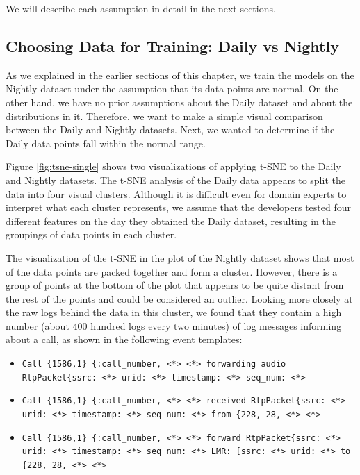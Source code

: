 We will describe each assumption in detail in the next sections.

\subsection{Choosing Data for Training: Daily vs Nightly}
\label{assumption-daily-vs-nightly}

As we explained in the earlier sections of this chapter, we train the models on the Nightly dataset under the assumption that its data points are normal. On the other hand, we have no prior assumptions about the Daily dataset and about the distributions in it. Therefore, we want to make a simple visual comparison between the Daily and Nightly datasets. Next, we wanted to determine if the Daily data points fall within the normal range.

Figure \ref{fig:tsne-single} shows two visualizations of applying t-SNE to the Daily and Nightly datasets. The t-SNE analysis of the Daily data appears to split the data into four visual clusters. Although it is difficult even for domain experts to interpret what each cluster represents, we assume that the developers tested four different features on the day they obtained the Daily dataset, resulting in the groupings of data points in each cluster.

The visualization of the t-SNE in the plot of the Nightly dataset shows that most of the data points are packed together and form a cluster. However, there is a group of points at the bottom of the plot that appears to be quite distant from the rest of the points and could be considered an outlier. Looking more closely at the raw logs behind the data in this cluster, we found that they contain a high number (about $400$ hundred logs every two minutes) of log messages informing about a call, as shown in the following event templates:

\begin{itemize}
    \item \texttt{\justify Call \{1586,1\} \{:call\_number, <*> <*> forwarding audio RtpPacket\{ssrc: <*> urid: <*> timestamp: <*> seq\_num: <*>}
    \item \texttt{\justify Call \{1586,1\} \{:call\_number, <*> <*> received RtpPacket\{ssrc: <*> urid: <*> timestamp: <*> seq\_num: <*> from \{228, 28, <*> <*>}
    \item \texttt{\justify Call \{1586,1\} \{:call\_number, <*> <*> forward RtpPacket\{ssrc: <*> urid: <*> timestamp: <*> seq\_num: <*> LMR: [ssrc: <*> urid: <*> to \{228, 28, <*> <*>}
\end{itemize}

